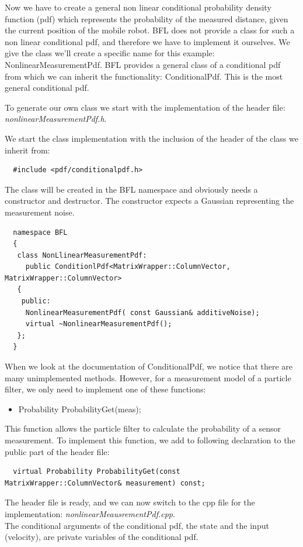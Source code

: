 \documentclass[a4paper,10pt]{report}
\begin{document}
Now we have to create a general non linear conditional probability
density function (pdf) which represents the probability of the
measured distance, given the current position of the mobile robot. BFL
does not provide a class for such a non linear conditional pdf, and
therefore we have to implement it ourselves.  We give the class we'll
create a specific name for this example: NonlinearMeasurementPdf.  BFL
provides a general class of a conditional pdf from which we can
inherit the functionality: ConditionalPdf. This is the most general
conditional pdf.

To generate our own class we start with the implementation of the
header file: \emph{nonlinearMeasurementPdf.h}.

We start the class implementation with the inclusion of the header of
the class we inherit from:
\begin{verbatim}
  #include <pdf/conditionalpdf.h>
\end{verbatim}
The class will be created in the BFL namespace and obviously needs a
constructor and destructor. The constructor expects a Gaussian
representing the measurement noise.
\begin{verbatim}
  namespace BFL
  {
   class NonLlinearMeasurementPdf: 
     public ConditionlPdf<MatrixWrapper::ColumnVector, MatrixWrapper::ColumnVector>
   {
    public:
     NonlinearMeasurementPdf( const Gaussian& additiveNoise);
     virtual ~NonlinearMeasurementPdf();
   };
  }
\end{verbatim}
When we look at the documentation of ConditionalPdf, we notice that
there are many unimplemented methods. However, for a measurement model
of a particle filter, we only need to implement one of these
functions:
\begin{itemize}
  \item Probability ProbabilityGet(meas);
\end{itemize}
This function allows the particle filter to calculate the probability
of a sensor measurement. To implement this function, we add to
following declaration to the public part of the header file:
\begin{verbatim}
  virtual Probability ProbabilityGet(const MatrixWrapper::ColumnVector& measurement) const;
\end{verbatim}
The header file is ready, and we can now switch to the cpp file for
the implementation:
\emph{nonlinearMeausrementPdf.cpp}.\\
The conditional arguments of the conditional pdf, the state and the
input (velocity), are private variables of the conditional pdf.\\
\end{document}
